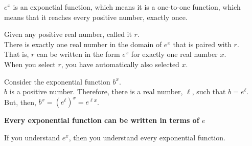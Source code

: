 \documentclass{ximera}
\begin{document}
$e^x$ is an exponetial function, which means it is a one-to-one function, which means that it reaches every positive number, exactly once. \\


\begin{observation}


Given any positive real number, called it $r$. \\

There is exactly one real number in the domain of $e^x$ that is paired with $r$. \\


That is, $r$ can be written in the form $e^x$ for exactly one real number $x$.  \\


When you select $r$, you have automatically also selected $x$.


\end{observation}








\begin{conclusion}


Consider the exponential function $b^x$. \\

$b$ is a positive number.  Therefore, there is a real number, $\ell$, such that $b = e^{\ell}$. \\


But, then, $b^x = \left( e^{\ell} \right)^x = e^{\ell x}$.


\begin{center}
\textbf{\textcolor{red!80!black}{Every exponential function can be written in terms of $e$}}
\end{center}



If you understand $e^x$, then you understand every exponential function.

\end{conclusion}
\end{document}
